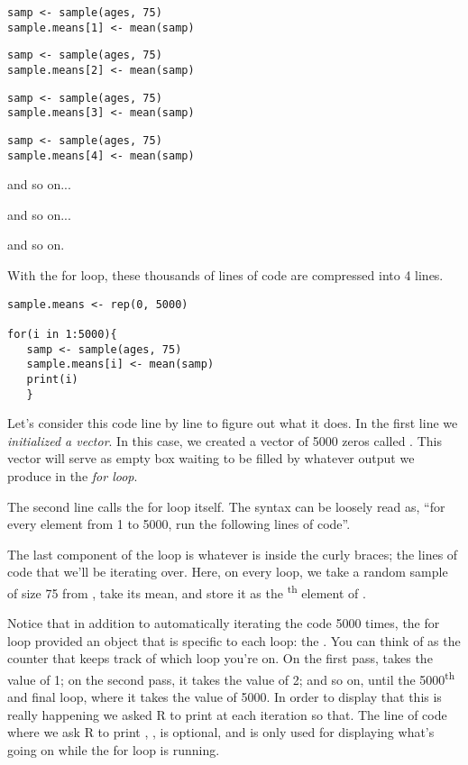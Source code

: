 \documentclass[11pt]{article}
\begin{document}
\begin{lstlisting}
samp <- sample(ages, 75)
sample.means[1] <- mean(samp)
\end{lstlisting}

\begin{lstlisting}
samp <- sample(ages, 75)
sample.means[2] <- mean(samp)
\end{lstlisting}

\begin{lstlisting}
samp <- sample(ages, 75)
sample.means[3] <- mean(samp)
\end{lstlisting}

\begin{lstlisting}
samp <- sample(ages, 75)
sample.means[4] <- mean(samp)
\end{lstlisting}

\hspace{.5 in}and so on...

\hspace{1.7 in} and so on...

\hspace{2.9 in} and so on.

With the for loop, these thousands of lines of code are compressed into 4 lines.

\begin{lstlisting}
sample.means <- rep(0, 5000)

for(i in 1:5000){
   samp <- sample(ages, 75)
   sample.means[i] <- mean(samp)
   print(i)
   }
\end{lstlisting}

Let's consider this code line by line to figure out what it does.  In the first line we \emph{initialized a vector}.  In this case, we created a vector of 5000 zeros called .  This vector will serve as empty box waiting to be filled by whatever output we produce in the \emph{for loop}.

The second line calls the for loop itself.  The syntax can be loosely read as, ``for every element  from 1 to 5000, run the following lines of code''.

The last component of the loop is whatever is inside the curly braces; the lines of code that we'll be iterating over.  Here, on every loop, we take a random sample of size 75 from , take its mean, and store it as the \textsuperscript{th} element of .

Notice that in addition to automatically iterating the code 5000 times, the for loop provided an object that is specific to each loop: the .  You can think of  as the counter that keeps track of which loop you're on.  On the first pass,  takes the value of 1; on the second pass, it takes the value of 2; and so on, until the 5000\textsuperscript{th} and final loop, where it takes the value of 5000. In order to display that this is really happening we asked R to print  at each iteration so that. The line of code where we ask R to print , , is optional, and is only used for displaying what's going on while the for loop is running.
\end{document}
